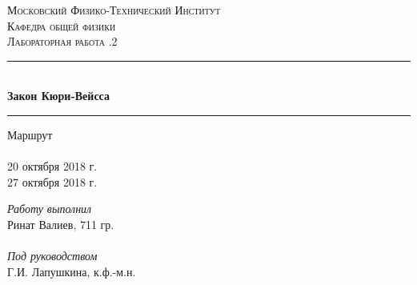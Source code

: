 \begin{titlepage}

\pagestyle{empty}	%

\begin{center}
	\textsc{\LARGE Московский Физико-Технический Институт}\\[1,5cm]
	\textsc{\Large Кафедра общей физики}\\[0,5cm]
	\textsc{\large Лабораторная работа .2}\\[2.5cm]

	\noindent\rule{\textwidth}{1pt}
	\\[0.5cm]
	{ \huge \bfseries Закон Кюри-Вейсса}
	\\[0.1cm]
	\noindent\rule{\textwidth}{1pt}
\end{center}

\vfill

\begin{minipage}[b]{0.3\textwidth}
	Маршрут \\\\
	20 октября 2018 г.\\
	27 октября 2018 г.
\end{minipage}
\hfill
\begin{minipage}[b]{0.33\textwidth}
	\textit{Работу выполнил}\\
	Ринат Валиев, 711 гр.\\\\
	\textit{Под руководством}\\
	Г.И. Лапушкина, к.ф.-м.н.
\end{minipage}

\end{titlepage}

\pagestyle{VR}
\setcounter{page}{2}